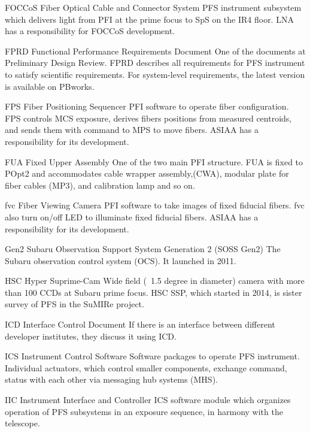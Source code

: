 {FOCCoS}
{Fiber Optical Cable and Connector System}
{PFS instrument subsystem which delivers light from PFI at the prime focus to SpS  on the IR4 floor. LNA has a responsibility for FOCCoS development.}


{FPRD}
{Functional Performance Requirements Document}
{One of the documents at Preliminary Design Review. FPRD describes all requirements for PFS instrument to satisfy scientific requirements. For system-level requirements, the latest version is available on PBworks.}


{FPS}
{Fiber Positioning Sequencer}
{PFI software to operate fiber configuration. FPS controls MCS exposure, derives fibers positions from measured centroids, and sends them with command to MPS to move fibers. ASIAA has a responsibility for its development.}


{FUA}
{Fixed Upper Assembly}
{One of the two main PFI structure. FUA is fixed to POpt2 and accommodates cable wrapper assembly,(CWA), modular plate for fiber cables (MP3), and calibration lamp and so on.}


{fvc}
{Fiber Viewing Camera}
{PFI software to take images of fixed fiducial fibers. fvc also turn on/off LED to illuminate fixed fiducial fibers. ASIAA has a responsibility for its development.}


{Gen2}
{Subaru Observation Support System Generation 2 (SOSS Gen2)}
{The Subaru observation control system (OCS). It launched in 2011.}


{HSC}
{Hyper Suprime-Cam}
{Wide field (~1.5 degree in diameter) camera with more than 100 CCDs at Subaru prime focus. HSC SSP, which started in 2014, is sister survey of PFS in the SuMIRe project.}


{ICD}
{Interface Control Document}
{If there is an interface between different developer institutes, they discuss it using ICD.}


{ICS}
{Instrument Control Software}
{Software packages to operate PFS instrument. Individual actuators, which control smaller components, exchange command, status with each other via messaging hub systems (MHS).}


{IIC}
{Instrument Interface and Controller}
{ICS software module which organizes operation of PFS subsystems in an exposure sequence, in harmony with the telescope.}


